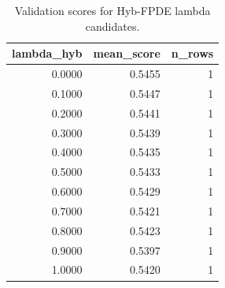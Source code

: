 \begin{table}[t]
\caption{Validation scores for Hyb-FPDE lambda candidates.}
\label{tab:lambda_distribution_computed}
\centering
\begin{tabular}{rrr}
\toprule
lambda\_hyb & mean\_score & n\_rows \\
\midrule
0.0000 & 0.5455 & 1 \\
0.1000 & 0.5447 & 1 \\
0.2000 & 0.5441 & 1 \\
0.3000 & 0.5439 & 1 \\
0.4000 & 0.5435 & 1 \\
0.5000 & 0.5433 & 1 \\
0.6000 & 0.5429 & 1 \\
0.7000 & 0.5421 & 1 \\
0.8000 & 0.5423 & 1 \\
0.9000 & 0.5397 & 1 \\
1.0000 & 0.5420 & 1 \\
\bottomrule
\end{tabular}

\end{table}
